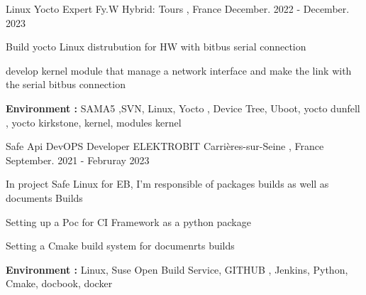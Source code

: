 \documentclass[11pt, a4paper]{awesome-cv} %
\begin{document}
\begin{cventries}
 \cventry
    {Linux Yocto Expert} %
    {Fy.W} %
    {Hybrid:  Tours , France} %
    {December. 2022 - December. 2023} %
    { %
        \begin{cvitems}
            \item {Build yocto Linux distrubution for HW with bitbus serial connection}
            \item {develop kernel module that manage a network interface and make the link with the serial bitbus connection}
            \item { \textbf{Environment :} SAMA5 ,SVN, Linux, Yocto , Device Tree, Uboot, yocto dunfell , yocto kirkstone, kernel, modules kernel}
        \end{cvitems}
    }

 \cventry
    {Safe Api DevOPS Developer} %
    {ELEKTROBIT} %
    {Carrières-sur-Seine , France} %
    {September. 2021 - Februray 2023} %
    { %
        \begin{cvitems}
            \item {In project Safe Linux for EB, I'm responsible of packages builds as well as documents Builds}
            \item {Setting up a Poc for CI Framework as a python package}
            \item {Setting a Cmake build system for documenrts builds}                        
            \item { \textbf{Environment :} Linux, Suse Open Build Service, GITHUB , Jenkins, Python, Cmake, docbook, docker}
        \end{cvitems}
    }



\end{cventries}
\end{document}
